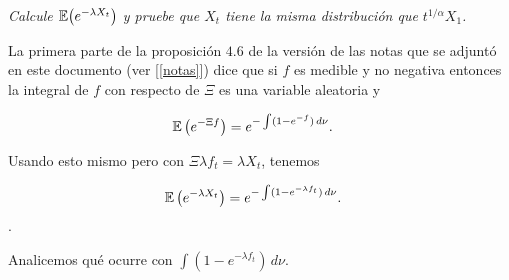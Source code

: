 \emph{
	Calcule $\mathbb{E}\! \left( e^{-\lambda X_t} \right)$ y pruebe que $X_{t}$ tiene la misma distribuci\'on que $t^{1/\alpha}X_1$.
}

\afterstatement\pn

La primera parte de la proposición $4.6$ de la versión de las notas que se adjuntó en este documento (ver [\ref{notas}]) dice que
si $f$ es medible y no negativa entonces la integral de $f$ con respecto de $\Xi$ es una variable aleatoria y 

\begin{align}
    \mathbb{E}\left( e^{-\Xi f} \right)   &=  e^{-\int (1-e^{-f}) \,d\nu}.
\end{align}\pn

Usando esto mismo pero con $\Xi \lambda f_t = \lambda X_t$, tenemos

\begin{align}
    \mathbb{E}\left( e^{- \lambda X_t} \right)   &=  e^{-\int (1-e^{-\lambda f_t}) \,d\nu}. \label{problema5_2:resultado4_6}
\end{align}\pn.

Analicemos qué ocurre con $\int (1-e^{-\lambda f_t}) \,d\nu$.

